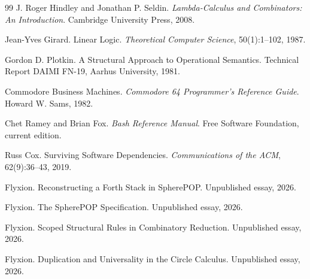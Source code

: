 \begin{thebibliography}{99}
 J. Roger Hindley and Jonathan P. Seldin. \emph{Lambda-Calculus and Combinators: An Introduction}. Cambridge University Press, 2008.

 Jean-Yves Girard. Linear Logic. \emph{Theoretical Computer Science}, 50(1):1--102, 1987.

 Gordon D. Plotkin. A Structural Approach to Operational Semantics. Technical Report DAIMI FN-19, Aarhus University, 1981.

 Commodore Business Machines. \emph{Commodore 64 Programmer's Reference Guide}. Howard W. Sams, 1982.

 Chet Ramey and Brian Fox. \emph{Bash Reference Manual}. Free Software Foundation, current edition.

 Russ Cox. Surviving Software Dependencies. \emph{Communications of the ACM}, 62(9):36--43, 2019.

 Flyxion. Reconstructing a Forth Stack in SpherePOP. Unpublished essay, 2026.

 Flyxion. The SpherePOP Specification. Unpublished essay, 2026.

 Flyxion. Scoped Structural Rules in Combinatory Reduction. Unpublished essay, 2026.

 Flyxion. Duplication and Universality in the Circle Calculus. Unpublished essay, 2026.

\end{thebibliography}

